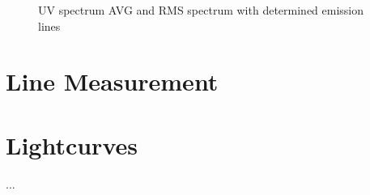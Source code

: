 \begin{figure}[!htbp]
	\centering
	\caption{UV spectrum AVG and RMS spectrum with determined emission lines}
	\label{fig:UV_uncalibrated_AVG_RMS}
\end{figure}


\section{Line Measurement}


\section{Lightcurves}
...
